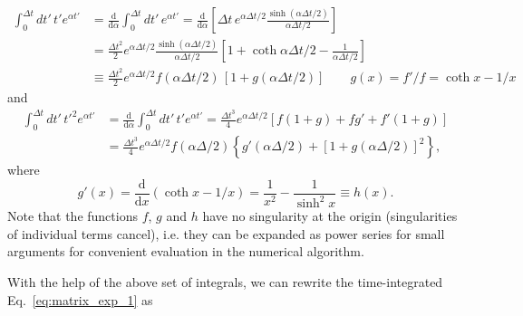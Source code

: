 \documentclass[12pt,letter]{article}
\begin{document}
\begin{equation}\begin{aligned}
\int_0^{\Delta t} d t'\, t' e^{\alpha t'} &= \frac{\mathrm{d}}{\mathrm{d}\alpha} \int_0^{\Delta t}dt'\,
e^{\alpha t'} = \frac{\mathrm{d}}{\mathrm{d}\alpha}\left[ \Delta t\, e^{\alpha \Delta t/2} \frac{\sinh(\alpha \Delta t/2)}{\alpha \Delta t/2}\right]\\
&= \frac{\Delta t^2}{2} e^{\alpha \Delta t/2} \frac{\sinh(\alpha \Delta t/2)}{\alpha \Delta t/2}
\left[1 + \coth \alpha \Delta t/2 - \frac{1}{\alpha \Delta t/2}\right]\\
&\equiv \frac{\Delta t^2}{2} e^{\alpha \Delta t/2} f(\alpha \Delta t/2)\,[1+g(\alpha \Delta t/2)]
\qquad g(x) = f'/f = \coth x - 1/x
\end{aligned}\end{equation}
and
\begin{equation}\begin{aligned}
\int_0^{\Delta t} d t'\, t'^2 e^{\alpha t'} &=\frac{\mathrm{d}}{\mathrm{d}\alpha} \int_0^{\Delta t}dt'\,
t' e^{\alpha t'}=\frac{\Delta t^3}{4} e^{\alpha \Delta t/2} [f (1+g) + f g' + f' (1+g)]\\
&=\frac{\Delta t^3}{4} e^{\alpha \Delta t/2} f(\alpha \Delta/2) \left\{g'(\alpha \Delta/2) + [1+g(\alpha \Delta/2)]^2\right\},
\end{aligned}\end{equation}
where
\begin{equation}
g'(x) = \frac{\mathrm{d}}{\mathrm{d}x}(\coth x - 1/x) = \frac{1}{x^2} - \frac{1}{\sinh^2 x} \equiv h(x).
\end{equation}
Note that the functions $f$, $g$ and $h$ have no singularity at the origin (singularities of individual
terms cancel), i.e. they can be expanded as power series for small arguments for convenient evaluation in the numerical algorithm.

With the help of the above set of integrals, we can rewrite the time-integrated Eq.~\eqref{eq:matrix_exp_1} as
\end{document}
